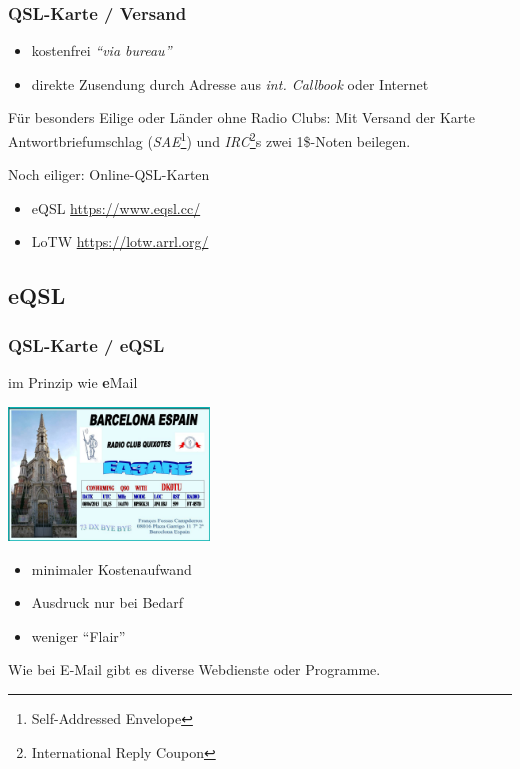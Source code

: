 \begin{frame}
    \frametitle{QSL-Karte / Versand}

    \begin{itemize}
		\item kostenfrei \emph{``via bureau''}
        \item direkte Zusendung durch Adresse aus \emph{int. Callbook} oder Internet
    \end{itemize}

    Für besonders Eilige oder Länder ohne Radio Clubs: Mit Versand der Karte
    Antwortbriefumschlag (\emph{SAE}\footnote{Self-Addressed Envelope}) und
    \emph{IRC}\footnote{International Reply Coupon}s zwei 1\$-Noten beilegen. \\[2em]

    \pause

    Noch eiliger: Online-QSL-Karten
    \begin{itemize}
      \item eQSL \url{https://www.eqsl.cc/}
      \item LoTW \url{https://lotw.arrl.org/}
    \end{itemize}

\end{frame}

\subsection{eQSL}

\begin{frame}
    \frametitle{QSL-Karte / eQSL}

    im Prinzip wie \textbf{e}Mail

    \begin{center}
		\includegraphics[width=0.4\textwidth]{bv13/eQSL_DK0TU-EA3ARE.jpg}
        \tiny \hyperlink{refs}{\cite{wc}}
    \end{center}

    \begin{itemize}
        \item minimaler Kostenaufwand
        \item Ausdruck nur bei Bedarf
		\item weniger ``Flair''
    \end{itemize}

    Wie bei E-Mail gibt es diverse Webdienste oder Programme.

\end{frame}

